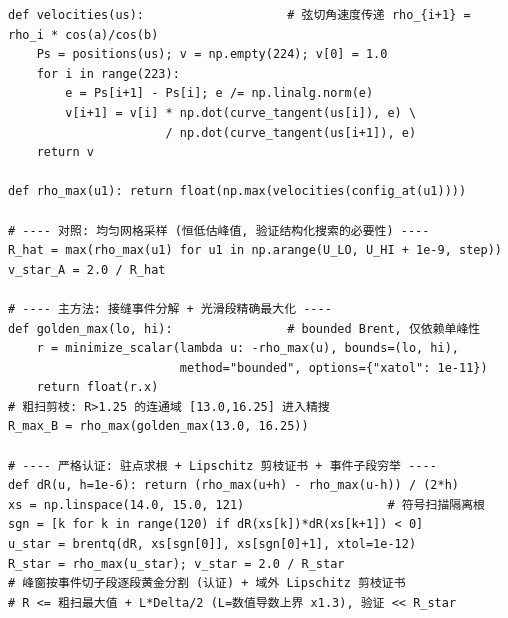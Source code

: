 ﻿\documentclass{cumcmthesis}
\begin{document}
\begin{appendices}
\begin{lstlisting}
def velocities(us):                    # 弦切角速度传递 rho_{i+1} = rho_i * cos(a)/cos(b)
    Ps = positions(us); v = np.empty(224); v[0] = 1.0
    for i in range(223):
        e = Ps[i+1] - Ps[i]; e /= np.linalg.norm(e)
        v[i+1] = v[i] * np.dot(curve_tangent(us[i]), e) \
                      / np.dot(curve_tangent(us[i+1]), e)
    return v

def rho_max(u1): return float(np.max(velocities(config_at(u1))))

# ---- 对照: 均匀网格采样 (恒低估峰值, 验证结构化搜索的必要性) ----
R_hat = max(rho_max(u1) for u1 in np.arange(U_LO, U_HI + 1e-9, step))
v_star_A = 2.0 / R_hat

# ---- 主方法: 接缝事件分解 + 光滑段精确最大化 ----
def golden_max(lo, hi):                # bounded Brent, 仅依赖单峰性
    r = minimize_scalar(lambda u: -rho_max(u), bounds=(lo, hi),
                        method="bounded", options={"xatol": 1e-11})
    return float(r.x)
# 粗扫剪枝: R>1.25 的连通域 [13.0,16.25] 进入精搜
R_max_B = rho_max(golden_max(13.0, 16.25))

# ---- 严格认证: 驻点求根 + Lipschitz 剪枝证书 + 事件子段穷举 ----
def dR(u, h=1e-6): return (rho_max(u+h) - rho_max(u-h)) / (2*h)
xs = np.linspace(14.0, 15.0, 121)                    # 符号扫描隔离根
sgn = [k for k in range(120) if dR(xs[k])*dR(xs[k+1]) < 0]
u_star = brentq(dR, xs[sgn[0]], xs[sgn[0]+1], xtol=1e-12)
R_star = rho_max(u_star); v_star = 2.0 / R_star
# 峰窗按事件切子段逐段黄金分割 (认证) + 域外 Lipschitz 剪枝证书
# R <= 粗扫最大值 + L*Delta/2 (L=数值导数上界 x1.3), 验证 << R_star
\end{lstlisting}
\end{appendices}
\end{document}
